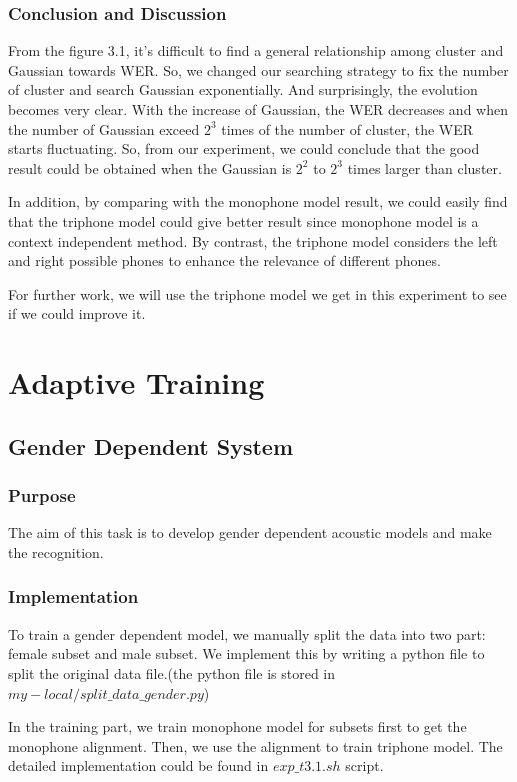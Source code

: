 \documentclass[]{article}
\begin{document}
\begin{multicols*}{2}
\subsubsection{Conclusion and Discussion}

From the figure 3.1, it's difficult to find a general relationship among cluster and Gaussian towards WER. So, we changed our searching strategy to fix the number of cluster and search Gaussian exponentially. And surprisingly, the evolution becomes very clear. With the increase of Gaussian, the WER decreases and when the number of Gaussian exceed $2^3$ times of the number of cluster, the WER starts fluctuating. So, from our experiment, we could conclude that the good result could be obtained when the Gaussian is $2^2$ to $2^3$ times larger than cluster.

In addition, by comparing with the monophone model result, we could easily find that the triphone model could give better result since monophone model is a context independent method. By contrast, the triphone model considers the left and right possible phones to enhance the relevance of different phones.

For further work, we will use the triphone model we get in this experiment to see if we could improve it.

\section{Adaptive Training}
\subsection{Gender Dependent System}
\subsubsection{Purpose}
The aim of this task is to develop gender dependent acoustic models and make the recognition.
\subsubsection{Implementation}
To train a gender dependent model, we manually split the data into two part: female subset and male subset. We implement this by writing a python file to split the original data file.(the python file is stored in $my-local/split\_data\_gender.py$)

In the training part, we train monophone model for subsets first to get the monophone alignment. Then, we use the alignment to train triphone model. The detailed implementation could be found in $exp\_t3.1.sh$ script.


\end{multicols*}
\end{document}
